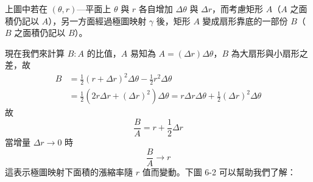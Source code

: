 上圖中若在 $(\theta, r)$—平面上 $\theta$ 與 $r$ 各自增加 $\Delta\theta$ 與 $\Delta r$，而考慮矩形 $A$（$A$ 之面積仍記以 $A$），另一方面經過極圖映射 $\gamma$ 後，矩形 $A$ 變成扇形靠底的一部份 $B$（$B$ 之面積仍記以 $B$）。

現在我們來計算 $B : A$ 的比值，$A$ 易知為 $A = (\Delta r)\Delta\theta$，$B$ 為大扇形與小扇形之差，故
\begin{align*}
  B &= \frac{1}{2}(r + \Delta r)^2\Delta\theta - \frac{1}{2}r^2\Delta\theta \\
    &= \frac{1}{2}(2r\Delta r + (\Delta r)^2)\Delta\theta = r\Delta r\Delta\theta + \frac{1}{2}(\Delta r)^2\Delta\theta
\end{align*}
故
\[
  \frac{B}{A} = r + \frac{1}{2}\Delta r
\]
當增量 $\Delta r \longrightarrow 0$ 時
\[
  \frac{B}{A} \longrightarrow r
\]
這表示極圖映射下面積的漲縮率隨 $r$ 值而變動。下圖 6-2 可以幫助我們了解：

